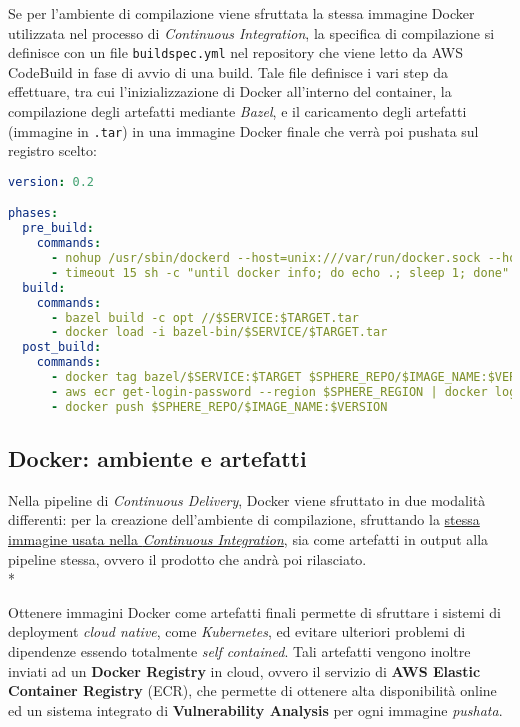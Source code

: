 \documentclass[../main.tex]{subfiles}
\begin{document}
        	    Se per l'ambiente di compilazione viene sfruttata la stessa immagine Docker utilizzata nel processo di \emph{Continuous Integration}, la specifica di compilazione si definisce con un file \verb|buildspec.yml| nel repository che viene letto da AWS CodeBuild in fase di avvio di una build. Tale file definisce i vari step da effettuare, tra cui l'inizializzazione di Docker all'interno del container, la compilazione degli artefatti mediante \emph{Bazel}, e il caricamento degli artefatti (immagine in \verb|.tar|) in una immagine Docker finale che verrà poi pushata sul registro scelto:
        	    \begin{lstlisting}[language=Yaml]
version: 0.2

phases:
  pre_build:
    commands:
      - nohup /usr/sbin/dockerd --host=unix:///var/run/docker.sock --host=tcp://127.0.0.1:2375 --storage-driver=overlay2 &
      - timeout 15 sh -c "until docker info; do echo .; sleep 1; done"
  build:
    commands:
      - bazel build -c opt //$SERVICE:$TARGET.tar
      - docker load -i bazel-bin/$SERVICE/$TARGET.tar
  post_build:
    commands:
      - docker tag bazel/$SERVICE:$TARGET $SPHERE_REPO/$IMAGE_NAME:$VERSION
      - aws ecr get-login-password --region $SPHERE_REGION | docker login --username AWS --password-stdin $SPHERE_REPO
      - docker push $SPHERE_REPO/$IMAGE_NAME:$VERSION
        	    \end{lstlisting}
        	
        	\subsection{Docker: ambiente e artefatti}
        	\label{sec:sphere_cd_docker}
    	
    	        Nella pipeline di \emph{Continuous Delivery}, Docker viene sfruttato in due modalità differenti: per la creazione dell'ambiente di compilazione, sfruttando la \hyperref[sec:cloud_arch_docker]{stessa immagine usata nella \emph{Continuous Integration}}, sia come artefatti in output alla pipeline stessa, ovvero il prodotto che andrà poi rilasciato.\\*
    	        
    	        Ottenere immagini Docker come artefatti finali permette di sfruttare i sistemi di deployment \emph{cloud native}, come \emph{Kubernetes}, ed evitare ulteriori problemi di dipendenze essendo totalmente \emph{self contained}. Tali artefatti vengono inoltre inviati ad un \textbf{Docker Registry} in cloud, ovvero il servizio di \textbf{AWS Elastic Container Registry} (ECR), che permette di ottenere alta disponibilità online ed un sistema integrato di \textbf{Vulnerability Analysis} per ogni immagine \emph{pushata}.
    	
\end{document}

